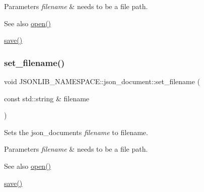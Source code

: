 \begin{DoxyParams}{Parameters}
{\em filename} & needs to be a file path. \\
\hline
\end{DoxyParams}
\begin{DoxySeeAlso}{See also}
\hyperlink{classJSONLIB__NAMESPACE_1_1json__document_a08e509059e628742f35716dddce2d740}{open()} 

\hyperlink{classJSONLIB__NAMESPACE_1_1json__document_af8f392a0ffc779277ead1f2bdb222930}{save()} 
\end{DoxySeeAlso}
\mbox{\label{classJSONLIB__NAMESPACE_1_1json__document_acc406344661e361c75ac7bc307057712}} 
\subsubsection{\texorpdfstring{set\+\_\+filename()}{set\_filename()}\hspace{0.1cm}{\footnotesize\ttfamily [2/2]}}
{\footnotesize\ttfamily void J\+S\+O\+N\+L\+I\+B\+\_\+\+N\+A\+M\+E\+S\+P\+A\+C\+E\+::json\+\_\+document\+::set\+\_\+filename (\begin{DoxyParamCaption}\item[{const std\+::string \&}]{filename }\end{DoxyParamCaption})}



Sets the json\+\_\+documents {\itshape filename} to {\ttfamily filename}. 


\begin{DoxyParams}{Parameters}
{\em filename} & needs to be a file path. \\
\hline
\end{DoxyParams}
\begin{DoxySeeAlso}{See also}
\hyperlink{classJSONLIB__NAMESPACE_1_1json__document_a08e509059e628742f35716dddce2d740}{open()} 

\hyperlink{classJSONLIB__NAMESPACE_1_1json__document_af8f392a0ffc779277ead1f2bdb222930}{save()} 
\end{DoxySeeAlso}
\mbox{\label{classJSONLIB__NAMESPACE_1_1json__document_a5a72e4dc0b37b95c70baefad930b5b71}} 
